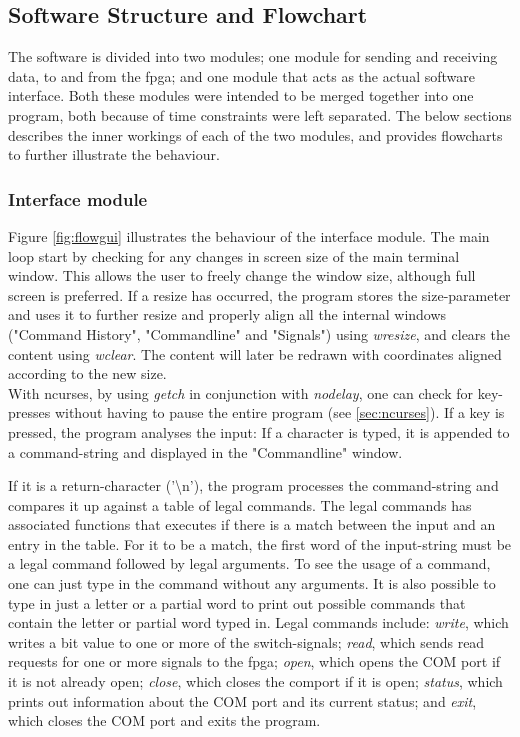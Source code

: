 \documentclass[main.tex]{subfiles}
\begin{document}
\subsection{Software Structure and Flowchart}

The software is divided into two modules; one module for sending and receiving data, to and from the \gls{fpga}; and one module that acts as the actual software interface. Both these modules were intended to be merged together into one program, both because of time constraints were left separated. The below sections describes the inner workings of each of the two modules, and provides flowcharts to further illustrate the behaviour.

\subsubsection{Interface module}
Figure \ref{fig:flowgui} illustrates the behaviour of the interface module. The main loop start by checking for any changes in screen size of the main terminal window. This allows the user to freely change the window size, although full screen is preferred. If a resize has occurred, the program stores the size-parameter and uses it to further resize and properly align all the internal windows ("Command History", "Commandline" and "Signals") using \textit{wresize}, and clears the content using \textit{wclear}. The content will later be redrawn with coordinates aligned according to the new size.\\

With ncurses, by using \textit{getch} in conjunction with \textit{nodelay}, one can check for key-presses without having to pause the entire program (see \ref{sec:ncurses}). If a key is pressed, the program analyses the input: If a character is typed, it is appended to a command-string and displayed in the "Commandline" window. 

If it is a return-character ('\textbackslash n'), the program processes the command-string and compares it up against a table of legal commands. The legal commands has associated functions that executes if there is a match between the input and an entry in the table. For it to be a match, the first word of the input-string must be a legal command followed by legal arguments. To see the usage of a command, one can just type in the command without any arguments. It is also possible to type in just a letter or a partial word to print out possible commands that contain the letter or partial word typed in. Legal commands include: \textit{write}, which writes a bit value to one or more of the switch-signals; \textit{read}, which sends read requests for one or more signals to the \gls{fpga}; \textit{open}, which opens the COM port if it is not already open; \textit{close}, which closes the comport if it is open; \textit{status}, which prints out information about the COM port and its current status; and \textit{exit}, which closes the COM port and exits the program.
\end{document}
